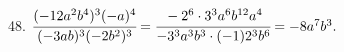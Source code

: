 48. $\cfrac{(-12a^2b^4)^3(-a)^4}{(-3ab)^3(-2b^2)^3}=\cfrac{-2^6\cdot 3^3 a^6 b^{12}a^4}{-3^3 a^3 b^3\cdot(-1)2^3 b^6}=-8a^7b^3.$\\
